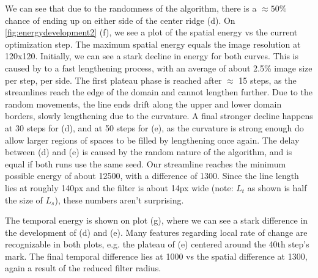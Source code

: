 We can see that due to the randomness of the algorithm, there is a $\approx50\%$ chance of ending up on either side of the center ridge (d).
\newpage
On \cref{fig:energydevelopment2} (f), we see a plot of the spatial energy vs the current optimization step. The maximum spatial energy equals the image resolution at 120x120.
Initially, we can see a stark decline in energy for both curves.
This is caused by to a fast lengthening process, with an average of about 2.5\% image size per step, per side.
The first plateau phase is reached after $\approx$ 15 steps, as the streamlines reach the edge of the domain and cannot lengthen further.
Due to the random movements, the line ends drift along the upper and lower domain borders, slowly lengthening due to the curvature.
A final stronger decline happens at 30 steps for (d), and at 50 steps for (e), as the curvature is strong enough do allow larger regions of spaces
to be filled by lengthening once again.
The delay between (d) and (e) is caused by the random nature of the algorithm, and is equal if both runs use the same seed.
Our streamline reaches the minimum possible energy of about 12500, with a difference of 1300.
Since the line length lies at roughly 140px and the filter is about 14px wide (note: $L_t$ as shown is half the size of $L_s$),
these numbers aren't surprising.

The temporal energy is shown on plot (g), where we can see a stark difference in the development of (d) and (e).
Many features regarding local rate of change are recognizable in both plots, e.g. the plateau of (e) centered around the 40th step's mark.
The final temporal difference lies at 1000 vs the spatial difference at 1300, again a result of the reduced filter radius.
\newpage

